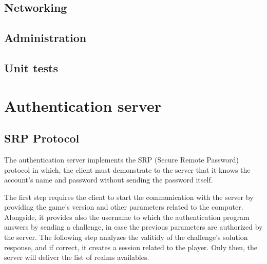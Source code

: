 \documentclass[paper=a4, fontsize=11pt]{scrartcl}
\begin{document}
\subsection{Networking}


\subsection{Administration}


\subsection{Unit tests}

\section{Authentication server}

\subsection{SRP Protocol}
The authentication server implements the SRP (Secure Remote Password) protocol 
in which, the client must demonstrate to the server that it knows the account's 
name and password without sending the password itself.

The first step requires the client to start the communication with the server
by providing the game's version and other parameters related to the computer. 
Alongside, it provides also the username to which the authentication program 
answers by sending a challenge, in case the previous parameters are 
authorized by the server. The following step analyzes the valitidy of the 
challenge's solution response, and if correct, it creates a session related to
the player.
Only then, the server will deliver the list of realms availables.
\end{document}
